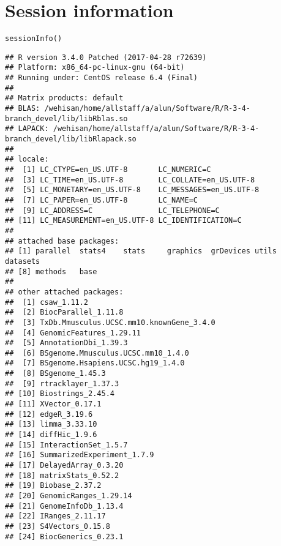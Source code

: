 \documentclass{report}\usepackage[]{graphicx}\usepackage[usenames,dvipsnames]{color}
\newcommand{\hlstd}[1]{\textcolor[rgb]{0.251,0.251,0.251}{#1}}%
\newcommand{\hlkwd}[1]{\textcolor[rgb]{0.878,0.439,0.125}{#1}}%
\newenvironment{knitrout}{}{} %
\begin{document}
\section{Session information}
\begin{knitrout}
\color{fgcolor}\begin{kframe}
\begin{alltt}
\hlkwd{sessionInfo}\hlstd{()}
\end{alltt}
\begin{verbatim}
## R version 3.4.0 Patched (2017-04-28 r72639)
## Platform: x86_64-pc-linux-gnu (64-bit)
## Running under: CentOS release 6.4 (Final)
## 
## Matrix products: default
## BLAS: /wehisan/home/allstaff/a/alun/Software/R/R-3-4-branch_devel/lib/libRblas.so
## LAPACK: /wehisan/home/allstaff/a/alun/Software/R/R-3-4-branch_devel/lib/libRlapack.so
## 
## locale:
##  [1] LC_CTYPE=en_US.UTF-8       LC_NUMERIC=C              
##  [3] LC_TIME=en_US.UTF-8        LC_COLLATE=en_US.UTF-8    
##  [5] LC_MONETARY=en_US.UTF-8    LC_MESSAGES=en_US.UTF-8   
##  [7] LC_PAPER=en_US.UTF-8       LC_NAME=C                 
##  [9] LC_ADDRESS=C               LC_TELEPHONE=C            
## [11] LC_MEASUREMENT=en_US.UTF-8 LC_IDENTIFICATION=C       
## 
## attached base packages:
## [1] parallel  stats4    stats     graphics  grDevices utils     datasets 
## [8] methods   base     
## 
## other attached packages:
##  [1] csaw_1.11.2                             
##  [2] BiocParallel_1.11.8                     
##  [3] TxDb.Mmusculus.UCSC.mm10.knownGene_3.4.0
##  [4] GenomicFeatures_1.29.11                 
##  [5] AnnotationDbi_1.39.3                    
##  [6] BSgenome.Mmusculus.UCSC.mm10_1.4.0      
##  [7] BSgenome.Hsapiens.UCSC.hg19_1.4.0       
##  [8] BSgenome_1.45.3                         
##  [9] rtracklayer_1.37.3                      
## [10] Biostrings_2.45.4                       
## [11] XVector_0.17.1                          
## [12] edgeR_3.19.6                            
## [13] limma_3.33.10                           
## [14] diffHic_1.9.6                           
## [15] InteractionSet_1.5.7                    
## [16] SummarizedExperiment_1.7.9              
## [17] DelayedArray_0.3.20                     
## [18] matrixStats_0.52.2                      
## [19] Biobase_2.37.2                          
## [20] GenomicRanges_1.29.14                   
## [21] GenomeInfoDb_1.13.4                     
## [22] IRanges_2.11.17                         
## [23] S4Vectors_0.15.8                        
## [24] BiocGenerics_0.23.1                     

\end{verbatim}
\end{kframe}
\end{knitrout}
\end{document}

